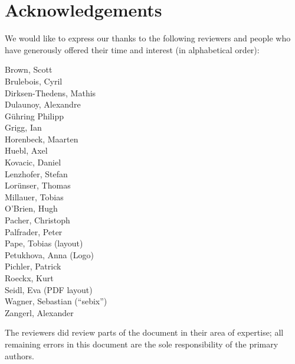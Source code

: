 \newpage
\section*{Acknowledgements}
\label{section:Reviewers}

We would like to express our thanks to the following reviewers and people who have generously offered their time and interest (in alphabetical order):

\begin{multicols}{2}{\parskip=0pt\centering\obeylines%
Brown, Scott \\
Brulebois, Cyril \\
Dirksen-Thedens, Mathis \\
Dulaunoy, Alexandre \\
G\"uhring Philipp  \\
Grigg, Ian  \\
Horenbeck, Maarten \\
Huebl, Axel \\
Kovacic, Daniel \\
Lenzhofer, Stefan \\
Lor\"unser, Thomas \\
Millauer, Tobias \\
O'Brien, Hugh \\
Pacher, Christoph \\
Palfrader, Peter \\
Pape, Tobias (layout) \\
Petukhova, Anna (Logo) \\
Pichler, Patrick \\
Roeckx, Kurt \\
Seidl, Eva (PDF layout) \\
Wagner, Sebastian (``sebix'') \\
Zangerl, Alexander \\
}\end{multicols}





The reviewers did review parts of the document in their area of
expertise; all remaining errors in this document are the sole
responsibility of the primary authors.





